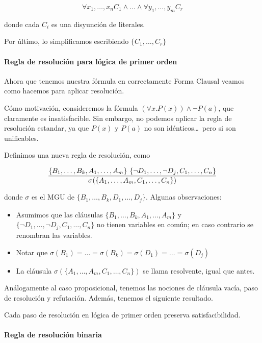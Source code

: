 \[\forall x_1,\dots,x_n C_1 \land \dots \land \forall y_1,\dots,y_m C_r\]

 donde cada $C_i$ es una disyunción de literales.

Por último, lo simplificamos escribiendo $\{C_1, \dots, C_r\}$

\paragraph{Regla de resolución para lógica de primer orden}

Ahora que tenemos nuestra fórmula en correctamente Forma Clausal veamos como hacemos para aplicar resolución.

Cómo motivación, consideremos la fórmula $(\forall x. P(x)) \land \lnot P(a)$, que claramente es insatisfacible. Sin embargo, no podemos aplicar la regla de resolución estandar, ya que $P(x)$ y $P(a)$ no son idénticos\dots\ pero si son unificables.

Definimos una nueva regla de resolución, como

\[\resol{\{B_1,\dots,B_k,A_1,\dots,A_m\}\ \{\lnot D_1,\dots,\lnot D_j,C_1,\dots,C_n\}}{\sigma(\{A_1,\dots,A_m, C_1,\dots,C_n\})}\]

donde $\sigma$ es el MGU de $\{B_1,\dots,B_k, D_1,\dots,D_j\}$. Algunas observaciones:
\begin{itemize}
  \item Asumimos que las cláusulas $\{B_1,\dots,B_k,A_1,\dots,A_m\}$ y $\{\lnot D_1,\dots,\lnot D_j,C_1,\dots,C_n\}$ no tienen variables en común; en caso contrario se renombran las variables.
  \item Notar que $\sigma(B_1) = \dots = \sigma(B_k) = \sigma(D_1) = \dots = \sigma(D_j) $
  \item La cláusula $\sigma(\{A_1,\dots,A_m, C_1,\dots,C_n\})$ se llama resolvente, igual que antes.
\end{itemize}

Análogamente al caso proposicional, tenemos las nociones de cláusula vacía, paso de resolución y refutación. Además, tenemos el siguiente resultado.

\begin{teo}
  Cada paso de resolución en lógica de primer orden preserva satisfacibilidad.
\end{teo}

\paragraph{Regla de resolución binaria}

